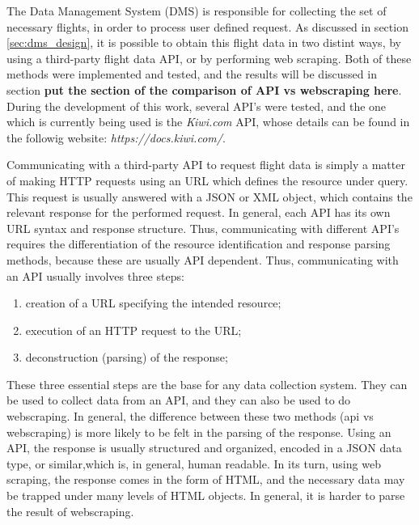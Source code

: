 
The Data Management System (DMS) is responsible for collecting the set of necessary flights, in order to process user defined request. As discussed in section \ref{sec:dms_design}, it is possible to obtain this flight data in two distint ways, by using a third-party flight data API, or by performing web scraping. Both of these methods were implemented and tested, and the results will be discussed in section \textbf{put the section  of the comparison of API vs webscraping here}. During the development of this work, several API's were tested, and the one which is currently being used is the \textit{Kiwi.com} API, whose details can be found in the followig website: \textit{https://docs.kiwi.com/}. 


Communicating with a third-party API to request flight data is simply a matter of making HTTP requests using an URL which defines the resource under query. This request is usually answered with a JSON or XML object, which contains the relevant response for the performed request. In general, each API has its own URL syntax and response structure. Thus, communicating with different API's requires the differentiation of the resource identification and response parsing methods, because these are usually API dependent. 
Thus, communicating with an API usually involves three steps:

\begin{enumerate}[noitemsep,topsep=0pt,parsep=0pt,partopsep=0pt]
  \item creation of a URL specifying the intended resource;
  \item execution of an HTTP request to the URL;
  \item deconstruction (parsing) of the response;
\end{enumerate}

These three essential steps are the base for any data collection system. They can be used to collect data from an API, and they can also be used to do webscraping. In general, the difference between these two methods (api vs webscraping) is more likely to be felt in the parsing of the response. Using an API, the response is usually structured and organized, encoded in a JSON data type, or similar,which is, in general, human readable. In its turn, using web scraping, the response comes in the form of HTML, and the necessary data may be trapped under many levels of HTML objects. In general, it is harder to parse the result of webscraping.

